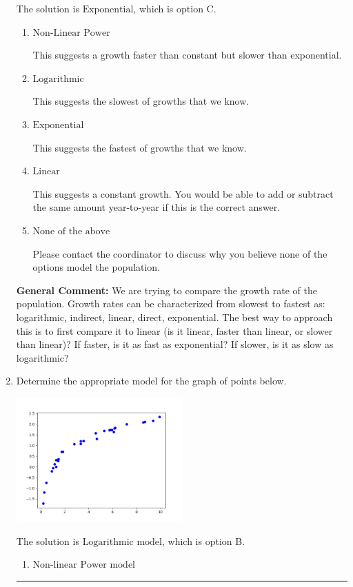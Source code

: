 \documentclass{extbook}[14pt]
\newcommand{\litem}[1]{\item #1

\rule{\textwidth}{0.4pt}}
\begin{document}
\begin{enumerate}
{The solution is \( \text{Exponential} \), which is option C.\begin{enumerate}[label=\Alph*.]
\item \( \text{Non-Linear Power} \)

This suggests a growth faster than constant but slower than exponential.
\item \( \text{Logarithmic} \)

This suggests the slowest of growths that we know.
\item \( \text{Exponential} \)

This suggests the fastest of growths that we know.
\item \( \text{Linear} \)

This suggests a constant growth. You would be able to add or subtract the same amount year-to-year if this is the correct answer.
\item \( \text{None of the above} \)

Please contact the coordinator to discuss why you believe none of the options model the population.
\end{enumerate}

\textbf{General Comment:} We are trying to compare the growth rate of the population. Growth rates can be characterized from slowest to fastest as: logarithmic, indirect, linear, direct, exponential. The best way to approach this is to first compare it to linear (is it linear, faster than linear, or slower than linear)? If faster, is it as fast as exponential? If slower, is it as slow as logarithmic?
}
\litem{
Determine the appropriate model for the graph of points below.

\begin{center}
    \includegraphics[width=0.5\textwidth]{../Figures/identifyModelGraph11C.png}
\end{center}




The solution is \( \text{Logarithmic model} \), which is option B.\begin{enumerate}[label=\Alph*.]
\item \( \text{Non-linear Power model} \)


\end{enumerate}}
\end{enumerate}
\end{document}
